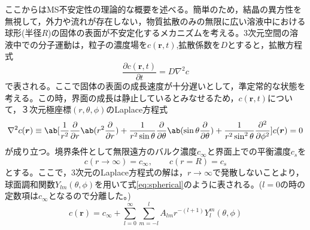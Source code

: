 \documentclass[autodetect-engine,dvi=dvipdfmx,a4paper,ja=standard,oneside,openany,11pt]{bxjsbook}
\begin{document}
ここからはMS不安定性の理論的な概要を述べる。簡単のため，結晶の異方性を無視して，外力や流れが存在しない，物質拡散のみの無限に広い溶液中における球形(半径$R$)の固体の表面が不安定化するメカニズムを考える\cite{フラクタル科学}\cite{mullins1963morphological}。3次元空間の溶液中での分子運動は，粒子の濃度場を$c(\bm{r},t)$,拡散係数を$D$とすると，拡散方程式
\begin{equation}
  \frac{\partial c(\bm{r},t)}{\partial t} = D\nabla^2c
  \label{eq:diffusion}
\end{equation}
で表される。ここで固体の表面の成長速度が十分遅いとして，準定常的な状態を考える。この時，界面の成長は静止しているとみなせるため，$c(\bm{r},t)$について，３次元極座標$(r,\theta,\phi)$のLaplace方程式
\begin{equation}
  \nabla^2c(\bm{r})\equiv \ab[\frac{1}{r^2}\pdv*{\ab(r^2\pdv{}{r})}{r}+\frac{1}{r^2\sin\theta}\pdv*{\ab(\sin\theta\pdv{}{\theta})}{\theta}+\frac{1}{r^2\sin^2\theta}\pdv[2]{}{\phi}]c(\bm{r})=0
  \label{eq:laplace}
\end{equation}
が成り立つ。境界条件として無限遠方のバルク濃度$c_{\infty}$と界面上での平衡濃度$c_s$を
\begin{equation}
  c(r\rightarrow \infty)  = c_{\infty}, \qquad c(r=R)= c_s
  \label{eq:boundary_MS}
\end{equation}
とする。ここで，3次元のLaplace方程式の解は，$r\to\infty$で発散しないことより，球面調和関数$Y_{lm}(\theta,\phi)$を用いて式\eqref{eq:spherical}のように表される。($l=0$の時の定数項は$c_\infty$となるので分離した。)
\begin{equation}
  c(\bm{r}) = c_{\infty} + \sum_{l=0}^{\infty}\sum_{m=-l}^{l}A_{lm}r^{-(l+1)}Y_{l}^{m}(\theta,\phi)
  \label{eq:spherical}
\end{equation}
\end{document}
